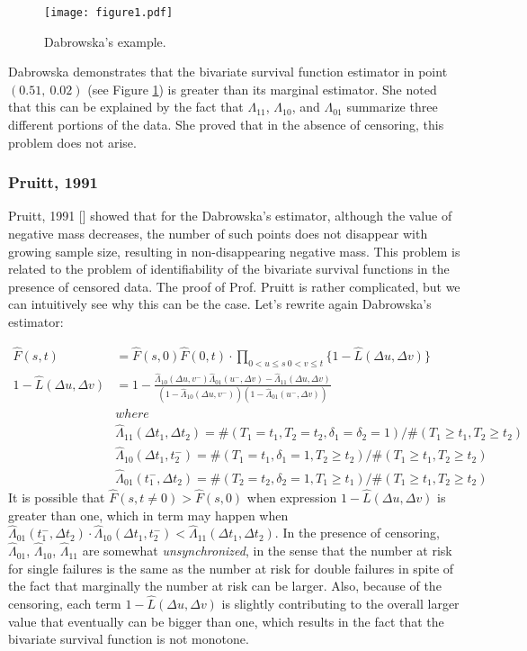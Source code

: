 \documentclass[]{article}
\begin{document}
\begin{figure}[!h]
\texttt{[image: figure1.pdf]}
\caption{Dabrowska's example.}
\label{fig:bubbles}
\end{figure}
\clearpage

Dabrowska demonstrates that the bivariate survival function estimator in point $(0.51,~0.02)$ (see Figure \ref{fig:bubbles}) is greater than its marginal estimator. She noted that this can be explained by the fact that $\Lambda_{11}$, $\Lambda_{10}$, and $\Lambda_{01}$ summarize three different portions of the data. She proved that in the absence of censoring, this problem does not arise.

\subsubsection{Pruitt, 1991 \cite{pruitt1991negative}}
Pruitt, 1991 [\cite{pruitt1991negative}] showed that for the Dabrowska's estimator, although the value of negative mass decreases, the number of such points does not disappear with growing sample size, resulting in non-disappearing negative mass. This problem is related to the problem of identifiability of the bivariate survival functions in the presence of censored data. The proof of Prof. Pruitt is rather complicated, but we can intuitively see why this can be the case. Let's rewrite again Dabrowska's estimator:

	$$
	\begin{aligned}
		\hat{F}(s,t) &= \hat{F}(s,0)\hat{F}(0,t)\cdot \prod_{{0<u\leq s~0<v\leq t}}\{1 - \hat{L}(\Delta u, \Delta v)\}\\
    1 - \hat{L}(\Delta u, \Delta v) &= 1 - \frac{\hat{\Lambda}_{10}(\Delta u,v^-)\hat{\Lambda}_{01}(u^-,\Delta v) - \hat{\Lambda}_{11}(\Delta u,\Delta v)}{\left(1-\hat{\Lambda}_{10}(\Delta u,v^-)\right)\left(1-\hat{\Lambda}_{01}(u^-,\Delta v)\right)}\\
  &where\\
	&\hat{\Lambda}_{11}(\Delta t_1, \Delta t_2) = \#(T_1=t_1, T_2=t_2, \delta_1=\delta_2=1)/\#(T_1\geq t_1, T_2\geq t_2)\\
	&\hat{\Lambda}_{10}(\Delta t_1, t_2^-) = \#(T_1=t_1, \delta_1=1, T_2\geq t_2)/\#(T_1\geq t_1, T_2\geq t_2)\\
	&\hat{\Lambda}_{01}(t_1^-,\Delta  t_2) = \#(T_2=t_2, \delta_2=1, T_1\geq t_1)/\#(T_1\geq t_1, T_2\geq t_2)		
	\end{aligned}
	$$
It is possible that $\hat{F}(s,t\neq 0) > \hat{F}(s,0)$ when expression $1 - \hat{L}(\Delta u, \Delta v)$ is greater than one, which in term may happen when  $\hat{\Lambda}_{01}(t_1^-,\Delta  t_2) \cdot \hat{\Lambda}_{10}(\Delta t_1, t_2^-)< \hat{\Lambda}_{11}(\Delta t_1, \Delta t_2)$. In the presence of censoring, $\hat{\Lambda}_{01}$, $\hat{\Lambda}_{10}$, $\hat{\Lambda}_{11}$ are somewhat \emph{unsynchronized}, in the sense that the number at risk for single failures is the same as the number at risk for double failures in spite of the fact that marginally the number at risk can be larger. Also, because of the censoring, each term $1 - \hat{L}(\Delta u, \Delta v)$ is slightly contributing to the overall larger value that eventually can be bigger than one, which results in the fact that the bivariate survival function is not monotone.
\end{document}
